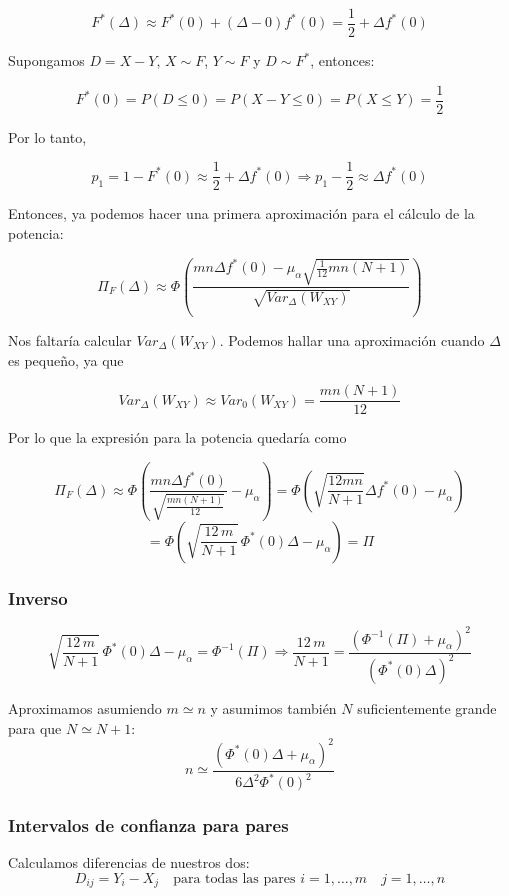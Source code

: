 $$
F^*(\Delta)\approx F^*(0)+(\Delta-0) f^*(0)=\frac{1}{2}+\Delta f^*(0)
$$

Supongamos $D=X-Y$, $X\sim F$, $Y\sim F$ y $D\sim F^*$, entonces:

$$
F^*(0)=P(D\leq 0)=P(X-Y\leq 0)=P(X\leq Y)=\frac{1}{2}
$$

Por lo tanto,

$$
p_1=1-F^*(0)\approx\frac{1}{2}+\Delta f^*(0) \Longrightarrow p_1-\frac{1}{2}\approx \Delta f^*(0)
$$

Entonces, ya podemos hacer una primera aproximación para el cálculo de la potencia:

$$
\Pi_F(\Delta)\approx \Phi\left(\frac{mn\Delta f^*(0)-\mu_\alpha\sqrt{\frac{1}{12}mn(N+1)}}{\sqrt{Var_\Delta(W_{XY})}}\right)
$$

Nos faltaría calcular $Var_\Delta(W_{XY})$. Podemos hallar una aproximación cuando $\Delta$ es pequeño, ya que 

$$
Var_\Delta(W_{XY})\approx Var_0(W_{XY})=\frac{mn(N+1)}{12}
$$

Por lo que la expresión para la potencia quedaría como

$$
\Pi_F(\Delta)\approx\Phi\left(\frac{mn\Delta f^*(0)}{\sqrt{\frac{mn(N+1)}{12}}}-\mu_\alpha\right)=\Phi\left(\sqrt{\frac{12mn}{N+1}}\Delta f^*(0)-\mu_\alpha\right)
$$
\[
    =\Phi\left(\sqrt{\frac{12 \, m}{N+1}} \, \Phi^*(0) \Delta - \mu_\alpha\right) = \Pi
\]

\subsubsection{Inverso}

\[
    \sqrt{\frac{12 \, m}{N+1}} \, \Phi^*(0) \Delta - \mu_\alpha = \Phi^{-1}(\Pi)
    \Longrightarrow 
    \frac{12 \, m}{N+1} = \frac{\left(\Phi^{-1}(\Pi) + \mu_\alpha\right)^2}{\left(\Phi^*(0) \Delta\right)^2}
\]

Aproximamos asumiendo $m \simeq  n$ y asumimos también $N$ suficientemente grande para que $N \simeq N+1$:
\[
    n \simeq \frac{\left(\Phi^*(0) \Delta + \mu_\alpha\right)^2}{6 \Delta^2 \Phi^*(0)^2}
\]

\subsubsection{Intervalos de confianza para pares}

Calculamos diferencias de nuestros dos:
\[
    D_{ij} = Y_i - X_j \quad \text{para todas las pares } i=1, \dots, m \quad j=1, \dots, n
\]

